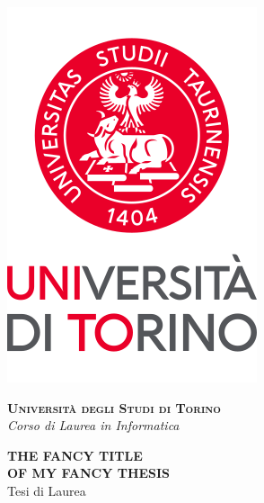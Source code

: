\begin{titlepage}
	{

    \begin{center}
        \includegraphics[scale=.4]{head/logo.png}
    \end{center}
    \begin{center}
        \vspace{10mm}
        {\Large
        	{\textsc
        		{\bf Universit\`a degli Studi di Torino\\} 
        		\vspace{2mm}
        		\emph{Corso di Laurea in Informatica}
        	}
       	}
        \vspace{5mm}
    \end{center}
    \begin{center}
        \vspace{5mm}
        {\LARGE{\bf THE FANCY TITLE\\ OF MY FANCY THESIS\\}} %
        \vspace{3mm}
        {\large{Tesi di Laurea\\}}
    \end{center}
    \vspace{10mm}
    \par
    \noindent
    \begin{minipage}[t]{0.47\textwidth}

\end{minipage}}
\end{titlepage}
